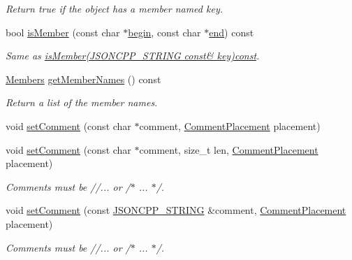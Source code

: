 \begin{DoxyCompactItemize}
\begin{DoxyCompactList}\small\item\em Return true if the object has a member named key. \end{DoxyCompactList}\item 
bool \hyperlink{classJson_1_1Value_a077604b87a79d75543a1b5438eb9d8ab}{is\+Member} (const char $\ast$\hyperlink{classJson_1_1Value_ac12df0d6980600c5bac908ed0f64856e}{begin}, const char $\ast$\hyperlink{classJson_1_1Value_a596da1926b2f2a4056bff2edb713eb0b}{end}) const 
\begin{DoxyCompactList}\small\item\em Same as \hyperlink{classJson_1_1Value_ab68c6bcc59930e517495013394c93c83}{is\+Member(\+J\+S\+O\+N\+C\+P\+P\+\_\+\+S\+T\+R\+I\+N\+G const\& key)const}. \end{DoxyCompactList}\item 
\hyperlink{classJson_1_1Value_a9ae9069983fc38f1928d76f9c79ac64d}{Members} \hyperlink{classJson_1_1Value_a30fa08af88f2d0a038b22ba9f4e88b2a}{get\+Member\+Names} () const 
\begin{DoxyCompactList}\small\item\em Return a list of the member names. \end{DoxyCompactList}\item 
void \hyperlink{classJson_1_1Value_a29f3a30f7e5d3af6f38d57999bf5b480}{set\+Comment} (const char $\ast$comment, \hyperlink{namespaceJson_a4fc417c23905b2ae9e2c47d197a45351}{Comment\+Placement} placement)
\item 
void \hyperlink{classJson_1_1Value_a2900152a2887b410a9ddabe278b9d492}{set\+Comment} (const char $\ast$comment, size\+\_\+t len, \hyperlink{namespaceJson_a4fc417c23905b2ae9e2c47d197a45351}{Comment\+Placement} placement)
\begin{DoxyCompactList}\small\item\em Comments must be //... or /$\ast$ ... $\ast$/. \end{DoxyCompactList}\item 
void \hyperlink{classJson_1_1Value_a2c5d13a5f45eb77e912008778e65b27f}{set\+Comment} (const \hyperlink{json_8hpp_a1e723f95759de062585bc4a8fd3fa4be}{J\+S\+O\+N\+C\+P\+P\+\_\+\+S\+T\+R\+I\+NG} \&comment, \hyperlink{namespaceJson_a4fc417c23905b2ae9e2c47d197a45351}{Comment\+Placement} placement)
\begin{DoxyCompactList}\small\item\em Comments must be //... or /$\ast$ ... $\ast$/. \end{DoxyCompactList}\item 

\end{DoxyCompactItemize}
